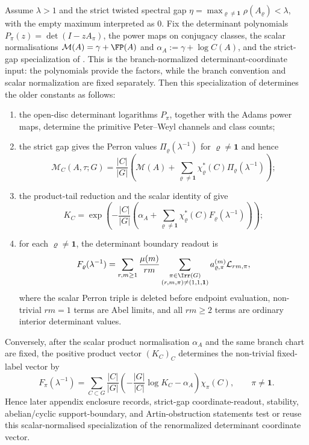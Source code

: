 \begin{proposition}
  \label{prop:class-mertens-product-dependency-chain}
  Assume \(\lambda>1\) and the strict twisted spectral gap
  \(\eta=\max_{\varrho\ne\mathbf1}\rho(A_\varrho)<\lambda\), with the empty
  maximum interpreted as \(0\).  Fix the determinant polynomials
  \(P_\pi(z)=\det(I-zA_\pi)\), the power maps on conjugacy classes, the scalar
  normalisations \(\mathcal M(A)=\gamma+\FP(A)\) and
  \(\alpha_A:=\gamma+
  \log C(A)\), and the strict-gap specialization of
  .  This is the
  branch-normalized determinant-coordinate input: the polynomials provide the
  factors, while the branch convention and scalar normalization are fixed
  separately.  Then this specialization of
  determines the older constants as follows:
  \begin{enumerate}[label=\textup{(\alph*)},leftmargin=*]
    \item the open-disc determinant logarithms \(P_\pi\), together with the
    Adams power maps, determine the primitive Peter--Weyl channels and class
    counts;
    \item the strict gap gives the Perron values
    \(\Pi_\varrho(\lambda^{-1})\) for \(\varrho\ne\mathbf1\) and hence
    \[
      \mathcal M_C(A,\tau;G)=
      \frac{|C|}{|G|}\left(\mathcal M(A)+
        \sum_{\varrho\ne\mathbf1}\chi_\varrho^\ast(C)
          \Pi_\varrho(\lambda^{-1})\right);
    \]
    \item the product-tail reduction and the scalar identity of
     give
    \[
      K_C=
      \exp\!\left(-\frac{|C|}{|G|}\left(\alpha_A+
        \sum_{\varrho\ne\mathbf1}\chi_\varrho^\ast(C)
          F_\varrho(\lambda^{-1})\right)\right);
    \]
    \item for each \(\varrho\ne\mathbf1\), the determinant boundary readout is
    \[
      F_\varrho(\lambda^{-1})=
      \sum_{r,m\ge1}\frac{\mu(m)}{rm}
      \sum_{\substack{\pi\in\Irr(G)\\(r,m,\pi)\ne(1,1,\mathbf1)}}
        a_{\varrho,\pi}^{(m)}\mathcal L_{rm,\pi},
    \]
    where the scalar Perron triple is deleted before endpoint evaluation,
    non-trivial \(rm=1\) terms are Abel limits, and all \(rm\ge2\) terms are
    ordinary interior determinant values.
  \end{enumerate}
  Conversely, after the scalar product normalisation \(\alpha_A\) and the same
  branch chart are fixed, the positive product vector \((K_C)_C\) determines
  the non-trivial fixed-label vector by
  \[
    F_\pi(\lambda^{-1})=
    \sum_{C\subset G}\frac{|C|}{|G|}
      \left(-\frac{|G|}{|C|}\log K_C-\alpha_A\right)\chi_\pi(C),
    \qquad \pi\ne\mathbf1 .
  \]
  Hence later appendix enclosure records, strict-gap coordinate-readout,
  stability, abelian/cyclic support-boundary, and Artin-obstruction statements
  test or reuse this scalar-normalised specialization of the renormalized
  determinant coordinate vector.
\end{proposition}


